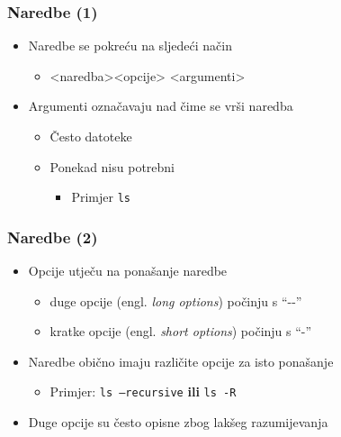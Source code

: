\documentclass{beamer}
\begin{document}
\begin{frame}[t]
\frametitle{Naredbe (1)}
\begin{itemize}
  \item Naredbe se pokreću na sljedeći način
  \begin{itemize}
    \item[] \textless naredba\textgreater \textless opcije\textgreater
          \textless argumenti\textgreater
  \end{itemize}
  \item Argumenti označavaju nad čime se vrši naredba
  \begin{itemize}
    \item Često datoteke
    \item Ponekad nisu potrebni
    \begin{itemize}
      \item Primjer \texttt{ls}
    \end{itemize}
  \end{itemize}
\end{itemize}
\end{frame}

\begin{frame}[t]
\frametitle{Naredbe (2)}
\begin{itemize}
  \item Opcije utječu na ponašanje naredbe
  \begin{itemize}
    \item duge opcije (engl. \emph{long options}) počinju s ``-{}-''
    \item kratke opcije (engl. \emph{short options}) počinju s ``-''
  \end{itemize}
  \item Naredbe obično imaju različite opcije za isto ponašanje
  \begin{itemize}
    \item Primjer: \texttt{ls --recursive} \textbf{ili}
          \texttt{ls -R}
  \end{itemize}
  \item Duge opcije su često opisne zbog lakšeg razumijevanja
\end{itemize}
\end{frame}
\end{document}
